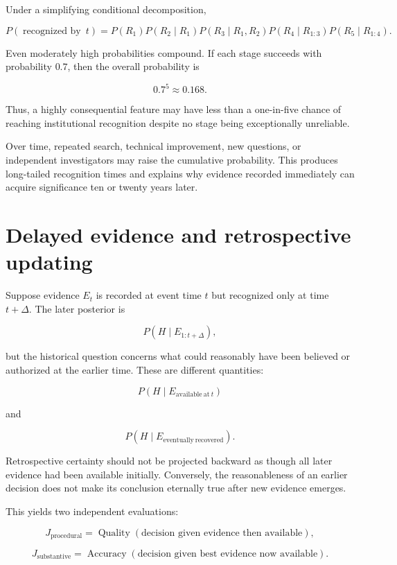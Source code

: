 Under a simplifying conditional decomposition,

\[
P(\operatorname{recognized\ by}\ t)
=
P(R_1)
P(R_2\mid R_1)
P(R_3\mid R_1,R_2)
P(R_4\mid R_{1:3})
P(R_5\mid R_{1:4}).
\]

Even moderately high probabilities compound. If each stage succeeds with probability \(0.7\), then the overall probability is

\[
0.7^5\approx0.168.
\]

Thus, a highly consequential feature may have less than a one-in-five chance of reaching institutional recognition despite no stage being exceptionally unreliable.

Over time, repeated search, technical improvement, new questions, or independent investigators may raise the cumulative probability. This produces long-tailed recognition times and explains why evidence recorded immediately can acquire significance ten or twenty years later.

\section{Delayed evidence and retrospective updating}
\label{sec:a59}

Suppose evidence \(E_t\) is recorded at event time \(t\) but recognized only at time \(t+\Delta\). The later posterior is

\[
P(H\mid E_{1:t+\Delta}),
\]

but the historical question concerns what could reasonably have been believed or authorized at the earlier time. These are different quantities:

\[
P(H\mid E_{\mathrm{available\ at}\ t})
\]

and

\[
P(H\mid E_{\mathrm{eventually\ recovered}}).
\]

Retrospective certainty should not be projected backward as though all later evidence had been available initially. Conversely, the reasonableness of an earlier decision does not make its conclusion eternally true after new evidence emerges.

This yields two independent evaluations:

\[
J_{\mathrm{procedural}}
=
\operatorname{Quality}
\left(
\text{decision given evidence then available}
\right),
\]

\[
J_{\mathrm{substantive}}
=
\operatorname{Accuracy}
\left(
\text{decision given best evidence now available}
\right).
\]

